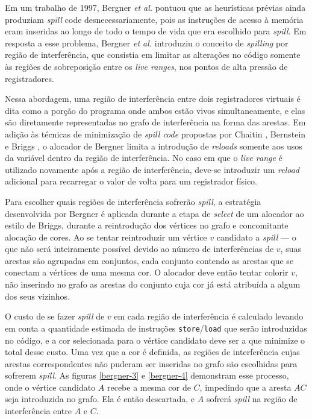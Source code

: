 \documentclass[
	12pt,				%
	openright,			%
	oneside,			%
	a4paper,			%
	tccpreliminar,			%
	]{ABNT-DC-UEL}
\begin{document}
Em um trabalho de 1997, Bergner \textit{et al.} \cite{bergner:97} pontuou que as heurísticas prévias ainda produziam \textit{spill} code desnecessariamente, pois as instruções de acesso à memória eram inseridas ao longo de todo o tempo de vida que era escolhido para \textit{spill}. Em resposta a esse problema, Bergner \textit{et al.} introduziu o conceito de \textit{spilling} por região de interferência, que consistia em limitar as alterações no código somente às regiões de sobreposição entre os \textit{live ranges}, nos pontos de alta pressão de registradores.

Nessa abordagem, uma região de interferência entre dois registradores virtuais é dita como a porção do programa onde ambos estão vivos simultaneamente, e elas são diretamente representadas no grafo de interferência na forma das arestas. Em adição às técnicas de minimização de \textit{spill code} propostas por Chaitin \cite{chaitin:81}, Bernstein \cite{bernstein:89} e Briggs \cite{briggs2:92}, o alocador de Bergner limita a introdução de \textit{reloads} somente aos usos da variável dentro da região de interferência. No caso em que o \textit{live range} é utilizado novamente após a região de interferência, deve-se introduzir um \textit{reload} adicional para recarregar o valor de volta para um registrador físico.

Para escolher quais regiões de interferência sofrerão \textit{spill}, a estratégia desenvolvida por Bergner é aplicada durante a etapa de \textit{select} de um alocador ao estilo de Briggs, durante a reintrodução dos vértices no grafo e concomitante alocação de cores. Ao se tentar reintroduzir um vértice $v$ candidato a \textit{spill} --- o que não será inteiramente possível devido ao número de interferências de $v$, suas arestas são agrupadas em conjuntos, cada conjunto contendo as arestas que se conectam a vértices de uma mesma cor. O alocador deve então tentar colorir $v$, não inserindo no grafo as arestas do conjunto cuja cor já está atribuída a algum dos seus vizinhos. 

O custo de se fazer \textit{spill} de $v$ em cada região de interferência é calculado levando em conta a quantidade estimada de instruções \texttt{store}/\texttt{load} que serão introduzidas no código, e a cor selecionada para o vértice candidato deve ser a que minimize o total desse custo. Uma vez que a cor é definida, as regiões de interferência cujas arestas correspondentes não puderam ser inseridas no grafo são escolhidas para sofrerem \textit{spill}. As figuras \ref{bergner-3} e \ref{bergner-4} demonstram esse processo, onde o vértice candidato $A$ recebe a mesma cor de $C$, impedindo que a aresta $AC$ seja introduzida no grafo. Ela é então descartada, e $A$ sofrerá \textit{spill} na região de interferência entre $A$ e $C$.
\end{document}
